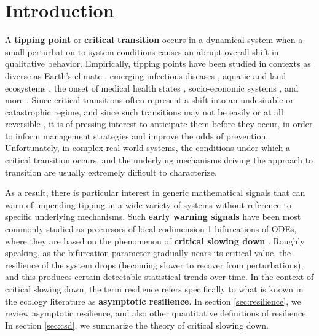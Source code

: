 
\section{Introduction}
\label{sec:intro}

A \textbf{tipping point} or \textbf{critical transition} occurs in a dynamical system when a small perturbation to system conditions causes an abrupt overall shift in qualitative behavior. 
%
Empirically, tipping points have been studied in contexts as diverse as
Earth's climate \cite{lentonTippingElementsEarth2008, dakosSlowingEarlyWarning2008a}, 
emerging infectious diseases \cite{brettDynamicalFootprintsEnable2020}, 
aquatic and land ecosystems \cite{schefferCatastrophicShiftsEcosystems2001a, carpenterRisingVarianceLeading2006}, 
the onset of medical health states \cite{mcsharryPredictionEpilepticSeizures2003, venegasSelforganizedPatchinessAsthma2005}, 
socio-economic systems \cite{ginkelClimateChangeInduced2020}, 
and more \cite{georgeEarlyWarningSignals2021, schefferEarlywarningSignalsCritical2009a}. 
%
Since critical transitions often represent a shift into an undesirable or catastrophic regime, and since such transitions may not be easily or at all reversible \cite{albrichClimateChangeCauses2020, chenImperfectVaccineHysteresis2019, lucariniThermodynamicAnalysisSnowball2010}, it is of pressing interest to anticipate them before they occur, in order to inform management strategies and improve the odds of prevention. Unfortunately, in complex real world systems, the conditions under which a critical transition occurs, and the underlying mechanisms driving the approach to transition are usually extremely difficult to characterize.

As a result, there is particular interest in generic mathematical signals that can warn of impending tipping in a wide variety of systems without reference to specific underlying mechanisms. Such \textbf{early warning signals} have been most commonly studied as precursors of local codimension-1 bifurcations of ODEs, where they are based on the phenomenon of \textbf{critical slowing down} \cite{schefferEarlywarningSignalsCritical2009a}. Roughly speaking, as the bifurcation parameter gradually nears its critical value, the resilience of the system drops (becoming slower to recover from perturbations), and this produces certain detectable statistical trends over time. In the context of critical slowing down, the term resilience refers specifically to what is known in the ecology literature as \textbf{asymptotic resilience}. In section \ref{sec:resilience}, we review asymptotic resilience, and also other quantitative definitions of resilience. In section \ref{sec:csd}, we summarize the theory of critical slowing down. 

